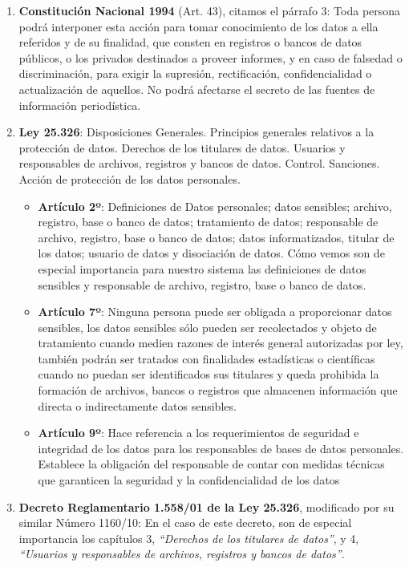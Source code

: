 	\begin{enumerate}
		\item \textbf{Constitución Nacional 1994} (Art. 43), citamos el párrafo 3:
        Toda persona podrá interponer esta acción para tomar conocimiento de los datos a ella referidos y de su finalidad, que consten en registros o bancos de datos públicos, o los privados destinados a proveer informes, y en caso de falsedad o discriminación, para exigir la supresión, rectificación, confidencialidad o actualización de aquellos.
        No podrá afectarse el secreto de las fuentes de información periodística.
        \item \textbf{Ley 25.326}:
        Disposiciones Generales. Principios generales relativos a la protección de datos. Derechos de los titulares de datos. Usuarios y responsables de archivos, registros y bancos de datos. Control. Sanciones. Acción de protección de los datos personales.
        
        \begin{itemize}
			\item \textbf{Artículo 2º}: Definiciones de Datos personales; datos sensibles; archivo, registro, base o banco de datos; tratamiento de datos; responsable de archivo, registro, base o banco de datos; datos informatizados, titular de los datos; usuario de datos y disociación de datos. Cómo vemos son de especial importancia para nuestro sistema las definiciones de datos sensibles y responsable de archivo, registro, base o banco de datos.
            \item \textbf{Artículo 7º}: Ninguna persona puede ser obligada a proporcionar datos sensibles, los datos sensibles sólo pueden ser recolectados y objeto de tratamiento cuando medien
razones de interés general autorizadas por ley, también podrán ser tratados con finalidades estadísticas o científicas cuando no puedan ser identificados sus titulares y queda prohibida la formación de archivos, bancos o registros que almacenen información que directa o indirectamente datos sensibles.
			\item \textbf{Artículo 9º}: Hace referencia a los requerimientos de seguridad e integridad de los datos para los responsables de bases de datos personales. Establece la obligación del responsable de contar con medidas técnicas que garanticen la seguridad y la confidencialidad de los datos
		\end{itemize}
		
		\item \textbf{Decreto Reglamentario 1.558/01 de la Ley 25.326}, modificado por su similar Número 1160/10:
        En el caso de este decreto, son de especial importancia los capítulos 3, \textit{``Derechos de los titulares de datos''}, y 4, \textit{``Usuarios y responsables de archivos, registros y bancos de datos''}.
        

\end{enumerate}
